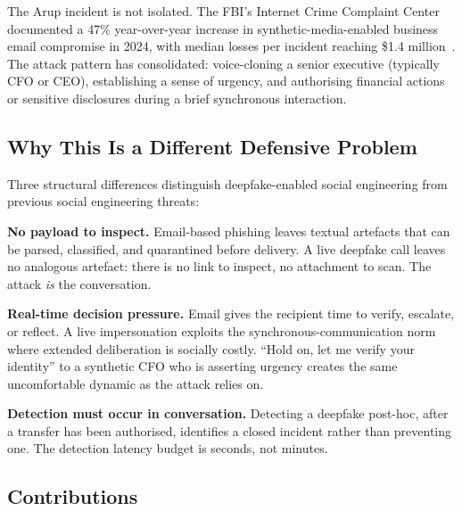 \documentclass[sigconf,nonacm]{acmart}
\begin{document}
The Arup incident is not isolated. The FBI's Internet Crime Complaint
Center documented a 47\% year-over-year increase in synthetic-media-enabled
business email compromise in 2024, with median losses per
incident reaching \$1.4 million~\cite{fbi2024ic3}. The attack pattern
has consolidated: voice-cloning a senior executive (typically CFO or
CEO), establishing a sense of urgency, and authorising financial actions
or sensitive disclosures during a brief synchronous interaction.

\subsection{Why This Is a Different Defensive Problem}

Three structural differences distinguish deepfake-enabled social
engineering from previous social engineering threats:

\textbf{No payload to inspect.} Email-based phishing leaves textual
artefacts that can be parsed, classified, and quarantined before delivery.
A live deepfake call leaves no analogous artefact: there is no link to
inspect, no attachment to scan. The attack \emph{is} the conversation.

\textbf{Real-time decision pressure.} Email gives the recipient time to
verify, escalate, or reflect. A live impersonation exploits the
synchronous-communication norm where extended deliberation is socially
costly. ``Hold on, let me verify your identity'' to a synthetic CFO who
is asserting urgency creates the same uncomfortable dynamic as the
attack relies on.

\textbf{Detection must occur in conversation.} Detecting a deepfake
post-hoc, after a transfer has been authorised, identifies a closed
incident rather than preventing one. The detection latency budget is
seconds, not minutes.

\subsection{Contributions}
\end{document}
